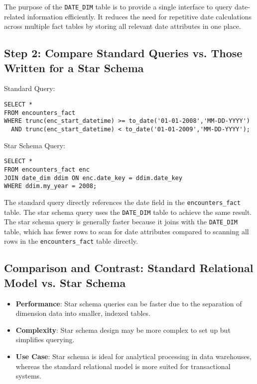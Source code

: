 \documentclass{article}
\begin{document}
The purpose of the \texttt{DATE\_DIM} table is to provide a single interface to query date-related information efficiently. It reduces the need for repetitive date calculations across multiple fact tables by storing all relevant date attributes in one place.

\subsection*{Step 2: Compare Standard Queries vs. Those Written for a Star Schema}

Standard Query:
\begin{verbatim}
SELECT * 
FROM encounters_fact
WHERE trunc(enc_start_datetime) >= to_date('01-01-2008','MM-DD-YYYY') 
  AND trunc(enc_start_datetime) < to_date('01-01-2009','MM-DD-YYYY');
\end{verbatim}

Star Schema Query:
\begin{verbatim}
SELECT * 
FROM encounters_fact enc 
JOIN date_dim ddim ON enc.date_key = ddim.date_key 
WHERE ddim.my_year = 2008;
\end{verbatim}

The standard query directly references the date field in the \texttt{encounters\_fact} table. The star schema query uses the \texttt{DATE\_DIM} table to achieve the same result. The star schema query is generally faster because it joins with the \texttt{DATE\_DIM} table, which has fewer rows to scan for date attributes compared to scanning all rows in the \texttt{encounters\_fact} table directly.

\subsection*{Comparison and Contrast: Standard Relational Model vs. Star Schema}

\begin{itemize}
    \item \textbf{Performance}: Star schema queries can be faster due to the separation of dimension data into smaller, indexed tables.
    \item \textbf{Complexity}: Star schema design may be more complex to set up but simplifies querying.
    \item \textbf{Use Case}: Star schema is ideal for analytical processing in data warehouses, whereas the standard relational model is more suited for transactional systems.
\end{itemize}
\end{document}

